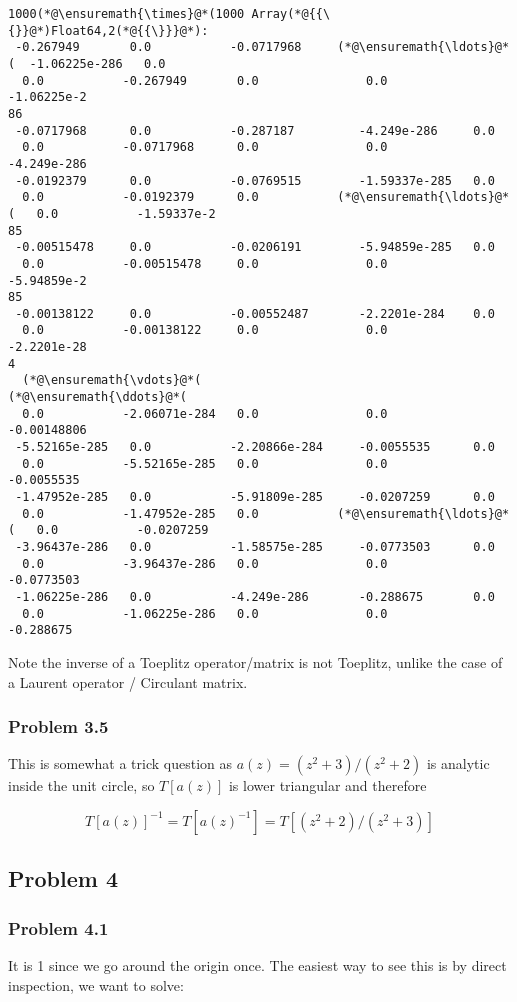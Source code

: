 \documentclass[12pt,landscape]{article}
\begin{document}
{\begin{lstlisting}
1000(*@\ensuremath{\times}@*(1000 Array(*@{{\{}}@*)Float64,2(*@{{\}}}@*):
 -0.267949       0.0           -0.0717968     (*@\ensuremath{\ldots}@*(  -1.06225e-286   0.0
  0.0           -0.267949       0.0               0.0           -1.06225e-2
86
 -0.0717968      0.0           -0.287187         -4.249e-286     0.0
  0.0           -0.0717968      0.0               0.0           -4.249e-286
 -0.0192379      0.0           -0.0769515        -1.59337e-285   0.0
  0.0           -0.0192379      0.0           (*@\ensuremath{\ldots}@*(   0.0           -1.59337e-2
85
 -0.00515478     0.0           -0.0206191        -5.94859e-285   0.0
  0.0           -0.00515478     0.0               0.0           -5.94859e-2
85
 -0.00138122     0.0           -0.00552487       -2.2201e-284    0.0
  0.0           -0.00138122     0.0               0.0           -2.2201e-28
4
  (*@\ensuremath{\vdots}@*(                                           (*@\ensuremath{\ddots}@*(                 
  0.0           -2.06071e-284   0.0               0.0           -0.00148806
 -5.52165e-285   0.0           -2.20866e-284     -0.0055535      0.0
  0.0           -5.52165e-285   0.0               0.0           -0.0055535
 -1.47952e-285   0.0           -5.91809e-285     -0.0207259      0.0
  0.0           -1.47952e-285   0.0           (*@\ensuremath{\ldots}@*(   0.0           -0.0207259
 -3.96437e-286   0.0           -1.58575e-285     -0.0773503      0.0
  0.0           -3.96437e-286   0.0               0.0           -0.0773503
 -1.06225e-286   0.0           -4.249e-286       -0.288675       0.0
  0.0           -1.06225e-286   0.0               0.0           -0.288675
\end{lstlisting}


Note the inverse of a Toeplitz operator/matrix is not Toeplitz, unlike the case of a Laurent operator / Circulant matrix.

\subsubsection{Problem 3.5}
This is somewhat a trick question as $a(z) = (z^2 + 3)/ (z^2 + 2)$ is analytic inside the unit circle, so $T[a(z)]$ is lower triangular and  therefore

\[
T[a(z)]^{-1} = T[a(z)^{-1}] = T[(z^2 + 2)/(z^2+3)]
\]
\subsection{Problem 4}
\subsubsection{Problem 4.1}
It is 1 since we go around the origin once. The easiest way to see this is by direct inspection, we want to solve:

}
\end{document}
